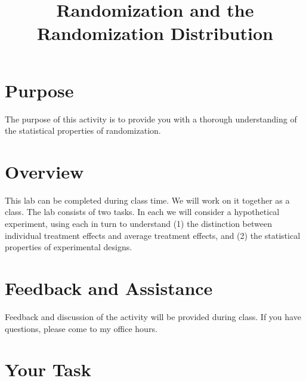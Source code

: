 \documentclass[a4paper,12pt]{article}
\title{Randomization and the Randomization Distribution}
\author{}
\date{}
\begin{document}
\vspace{-4em}

\maketitle

\vspace{-4em}

\section{Purpose}

The purpose of this activity is to provide you with a thorough understanding of the statistical properties of randomization. 

\section{Overview}

This lab can be completed during class time. We will work on it together as a class. The lab consists of two tasks. In each we will consider a hypothetical experiment, using each in turn to understand (1) the distinction between individual treatment effects and average treatment effects, and (2) the statistical properties of experimental designs.

\section{Feedback and Assistance}

Feedback and discussion of the activity will be provided during class. If you have questions, please come to my office hours.

\section{Your Task}
\end{document}
